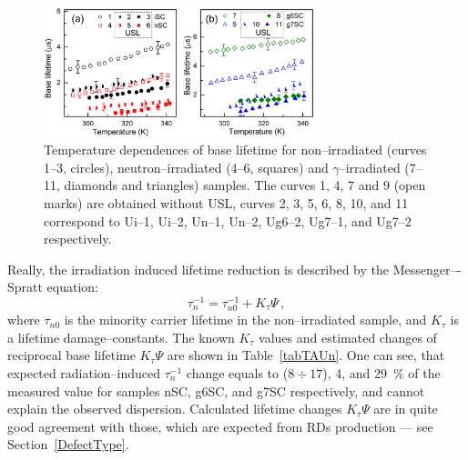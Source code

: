 \documentclass[aip,jap, amsmath,amssymb,reprint]{revtex4-1}
\begin{document}
\begin{figure}
\includegraphics[width=0.7\textwidth]{olikhFig6}%
\caption{\label{fig_TAUr}
Temperature dependences of base lifetime for non--irradiated (curves 1--3, circles),
neutron--irradiated (4--6, squares) and $\gamma$--irradiated (7--11, diamonds and triangles) samples.
The curves 1, 4, 7 and 9 (open marks) are obtained without USL,
curves 2, 3, 5, 6, 8, 10, and 11 correspond to
Ui--1, Ui--2, Un--1, Un--2, Ug6--2, Ug7--1, and Ug7--2 respectively.
}%
\end{figure}

Really, the irradiation induced lifetime reduction is described by the Messenger–-Spratt equation:\cite{Markvart}
\begin{equation}
\label{eqMS}
\tau_n^{-1}=\tau_{n0}^{-1}+K_\tau\Psi\,,
\end{equation}
where $\tau_{n0}$ is the minority carrier lifetime in the non--irradiated sample,
and $K_\tau$ is a lifetime damage--constants.
The known $K_\tau$ values and estimated changes of reciprocal base lifetime $K_\tau\Psi$ are shown in Table~\ref{tabTAUn}.
One can see, that expected radiation--induced $\tau_n^{-1}$ change equals to ($8\div17$), 4, and 29~\% of
the measured value for samples nSC, g6SC, and g7SC respectively, and cannot explain the observed dispersion.
Calculated lifetime changes $K_\tau\Psi$ are in quite good agreement with those, which are expected from RDs production --- see Section~\ref{DefectType}.
\end{document}
